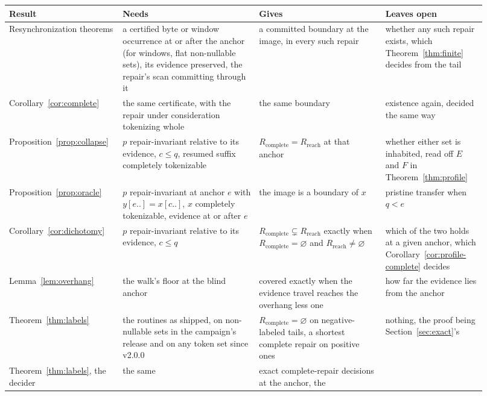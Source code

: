 \documentclass[11pt,a4paper]{article}
\theoremstyle{definition}
\theoremstyle{plain}
\theoremstyle{remark}
\newcommand{\Rreach}{R_{\mathrm{reach}}}
\newcommand{\Rcomp}{R_{\mathrm{complete}}}
\begin{document}
\begin{table}[htbp]
\centering
\small
\renewcommand{\arraystretch}{1.25}
\begin{tabular}{@{}>{\raggedright\arraybackslash}p{0.20\linewidth}p{0.27\linewidth}p{0.25\linewidth}p{0.20\linewidth}@{}}
\toprule
Result & Needs & Gives & Leaves open \\
\midrule
Resynchronization theorems & a certified byte or window occurrence at or after the anchor (for windows, flat
non-nullable sets), its evidence preserved, the repair's scan committing through it & a committed boundary at the image,
in every such repair & whether any such repair exists, which Theorem~\ref{thm:finite} decides from the tail \\
\addlinespace[2.5pt]
Corollary~\ref{cor:complete} & the same certificate, with the repair under consideration tokenizing whole &
the same boundary & existence again, decided the same way \\
\addlinespace[2.5pt]
Proposition~\ref{prop:collapse} & $p$ repair-invariant relative to its evidence, $c \le q$,
resumed suffix completely tokenizable & $\Rcomp = \Rreach$ at that anchor & whether either set is
inhabited, read off $E$ and $F$ in Theorem~\ref{thm:profile} \\
\addlinespace[2.5pt]
Proposition~\ref{prop:oracle} & $p$ repair-invariant at anchor $e$ with $y[e..] = x[c..]$, $x$ completely
tokenizable, evidence at or after $e$ & the image is a boundary of $x$ & pristine transfer when
$q < e$ \\
\addlinespace[2.5pt]
Corollary~\ref{cor:dichotomy} & $p$ repair-invariant relative to its evidence, $c \le q$ &
$\Rcomp \subsetneq \Rreach$ exactly when $\Rcomp = \varnothing$ and $\Rreach \ne \varnothing$ &
which of the two holds at a given anchor, which Corollary~\ref{cor:profile-complete} decides \\
\addlinespace[2.5pt]
Lemma~\ref{lem:overhang} & the walk's floor at the blind anchor & covered exactly when the evidence travel
reaches the overhang less one & how far the evidence lies from the anchor \\
\addlinespace[2.5pt]
Theorem~\ref{thm:labels} & the routines as shipped, on non-nullable sets in the campaign's release and on any token set
since v2.0.0 & $\Rcomp = \varnothing$ on negative-labeled tails, a shortest complete repair on positive ones & nothing,
the proof being Section~\ref{sec:exact}'s \\
\addlinespace[2.5pt]
Theorem~\ref{thm:labels}, the decider & the same & exact complete-repair decisions at the anchor, the

\end{tabular}
\end{table}
\end{document}
